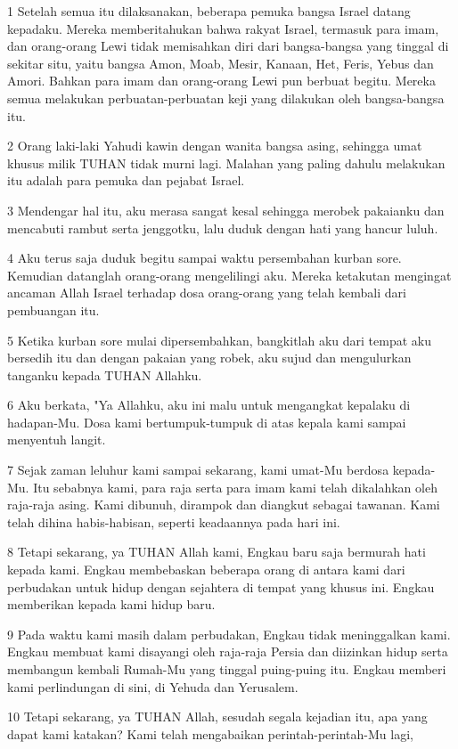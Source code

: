 \par 1 Setelah semua itu dilaksanakan, beberapa pemuka bangsa Israel datang kepadaku. Mereka memberitahukan bahwa rakyat Israel, termasuk para imam, dan orang-orang Lewi tidak memisahkan diri dari bangsa-bangsa yang tinggal di sekitar situ, yaitu bangsa Amon, Moab, Mesir, Kanaan, Het, Feris, Yebus dan Amori. Bahkan para imam dan orang-orang Lewi pun berbuat begitu. Mereka semua melakukan perbuatan-perbuatan keji yang dilakukan oleh bangsa-bangsa itu.
\par 2 Orang laki-laki Yahudi kawin dengan wanita bangsa asing, sehingga umat khusus milik TUHAN tidak murni lagi. Malahan yang paling dahulu melakukan itu adalah para pemuka dan pejabat Israel.
\par 3 Mendengar hal itu, aku merasa sangat kesal sehingga merobek pakaianku dan mencabuti rambut serta jenggotku, lalu duduk dengan hati yang hancur luluh.
\par 4 Aku terus saja duduk begitu sampai waktu persembahan kurban sore. Kemudian datanglah orang-orang mengelilingi aku. Mereka ketakutan mengingat ancaman Allah Israel terhadap dosa orang-orang yang telah kembali dari pembuangan itu.
\par 5 Ketika kurban sore mulai dipersembahkan, bangkitlah aku dari tempat aku bersedih itu dan dengan pakaian yang robek, aku sujud dan mengulurkan tanganku kepada TUHAN Allahku.
\par 6 Aku berkata, "Ya Allahku, aku ini malu untuk mengangkat kepalaku di hadapan-Mu. Dosa kami bertumpuk-tumpuk di atas kepala kami sampai menyentuh langit.
\par 7 Sejak zaman leluhur kami sampai sekarang, kami umat-Mu berdosa kepada-Mu. Itu sebabnya kami, para raja serta para imam kami telah dikalahkan oleh raja-raja asing. Kami dibunuh, dirampok dan diangkut sebagai tawanan. Kami telah dihina habis-habisan, seperti keadaannya pada hari ini.
\par 8 Tetapi sekarang, ya TUHAN Allah kami, Engkau baru saja bermurah hati kepada kami. Engkau membebaskan beberapa orang di antara kami dari perbudakan untuk hidup dengan sejahtera di tempat yang khusus ini. Engkau memberikan kepada kami hidup baru.
\par 9 Pada waktu kami masih dalam perbudakan, Engkau tidak meninggalkan kami. Engkau membuat kami disayangi oleh raja-raja Persia dan diizinkan hidup serta membangun kembali Rumah-Mu yang tinggal puing-puing itu. Engkau memberi kami perlindungan di sini, di Yehuda dan Yerusalem.
\par 10 Tetapi sekarang, ya TUHAN Allah, sesudah segala kejadian itu, apa yang dapat kami katakan? Kami telah mengabaikan perintah-perintah-Mu lagi,

